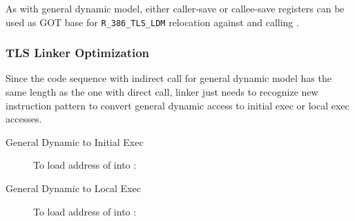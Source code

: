 \noindent
As with general dynamic model, either caller-save or callee-save
registers can be used as GOT base for \texttt{R_386_TLS_LDM}
relocation against  and calling .

\subsubsection{TLS Linker Optimization}

Since the code sequence with indirect call for general dynamic model
has the same length as the one with direct call, linker just needs to
recognize new instruction pattern to convert general dynamic access to
initial exec or local exec accesses.

\begin{description}

\item[General Dynamic to Initial Exec]
To load address of  into :

\begin{table}[H]
\Hrule
\caption{GD -> IE Code Transition}
\begin{center}
\myfontsize{}
\end{center}
\Hrule
\end{table}

\item[General Dynamic to Local Exec]
To load address of  into :

\begin{table}[H]
\Hrule
\caption{GD -> LE Code Transition}
\begin{center}
\myfontsize{}
\end{center}
\Hrule
\end{table}

\end{description}

